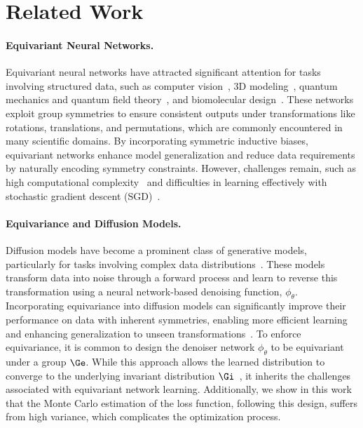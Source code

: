 \section{Related Work}

\paragraph{Equivariant Neural Networks.}  
Equivariant neural networks have attracted significant attention for tasks involving structured data, such as computer vision~, 3D modeling~, quantum mechanics and quantum field theory~, and biomolecular design~. These networks exploit group symmetries to ensure consistent outputs under transformations like rotations, translations, and permutations, which are commonly encountered in many scientific domains. By incorporating symmetric inductive biases, equivariant networks enhance model generalization and reduce data requirements by naturally encoding symmetry constraints. However, challenges remain, such as high computational complexity~ and difficulties in learning effectively with stochastic gradient descent (SGD)~.

\paragraph{Equivariance and Diffusion Models.}  
Diffusion models have become a prominent class of generative models, particularly for tasks involving complex data distributions~. These models transform data into noise through a forward process and learn to reverse this transformation using a neural network-based denoising function, \(\phi_\theta\). Incorporating equivariance into diffusion models can significantly improve their performance on data with inherent symmetries, enabling more efficient learning and enhancing generalization to unseen transformations~. To enforce equivariance, it is common to design the denoiser network \(\phi_\theta\) to be equivariant under a group \(\Ge\). While this approach allows the learned distribution to converge to the underlying invariant distribution \(\Gi\)~, it inherits the challenges associated with equivariant network learning. Additionally, we show in this work that the Monte Carlo estimation of the loss function, following this design, suffers from high variance, which complicates the optimization process.

